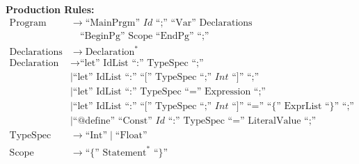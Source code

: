 \documentclass[12pt,a4paper]{article}
\begin{document}
\small
\textbf{Production Rules:}
\[
	\begin{array}{rl}
		\text{Program}                  & \rightarrow \text{``MainPrgm'' } \mathit{Id} \text{ ``;'' ``Var'' } \text{Declarations}                                                                                     \\
		                                & \quad \text{``BeginPg'' } \text{Scope} \text{ ``EndPg'' ``;''}                                                                                                              \\

		\text{Declarations}             & \rightarrow \text{Declaration}^*                                                                                                                                            \\

		\text{Declaration}              & \rightarrow \text{``let'' } \text{IdList} \text{ ``:'' } \text{TypeSpec} \text{ ``;''}                                                                                      \\
		                                & \mid \text{``let'' } \text{IdList} \text{ ``:'' ``['' } \text{TypeSpec} \text{ ``;'' } \mathit{Int} \text{ ``]'' ``;''}                                                     \\
		                                & \mid \text{``let'' } \text{IdList} \text{ ``:'' } \text{TypeSpec} \text{ ``='' } \text{Expression} \text{ ``;''}                                                            \\
		                                & \mid \text{``let'' } \text{IdList} \text{ ``:'' ``['' } \text{TypeSpec} \text{ ``;'' } \mathit{Int} \text{ ``]'' ``='' ``\{'' } \text{ExprList} \text{ ``\}'' ``;''}        \\
		                                & \mid \text{``@define'' ``Const'' } \mathit{Id} \text{ ``:'' } \text{TypeSpec} \text{ ``='' } \text{LiteralValue} \text{ ``;''}                                              \\

		\text{TypeSpec}                 & \rightarrow \text{``Int''} \mid \text{``Float''}                                                                                                                            \\

		\text{Scope}                    & \rightarrow \text{``\{'' } \text{Statement}^* \text{ ``\}''}                                                                                                                \\


\end{array}\]
\end{document}
